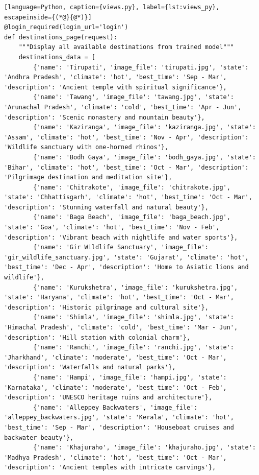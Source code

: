 \begin{lstlisting}[language=Python, caption={views.py}, label={lst:views_py}, escapeinside={(*@}{@*)}]
@login_required(login_url='login')
def destinations_page(request):
    """Display all available destinations from trained model"""
    destinations_data = [
        {'name': 'Tirupati', 'image_file': 'tirupati.jpg', 'state': 'Andhra Pradesh', 'climate': 'hot', 'best_time': 'Sep - Mar', 'description': 'Ancient temple with spiritual significance'},
        {'name': 'Tawang', 'image_file': 'tawang.jpg', 'state': 'Arunachal Pradesh', 'climate': 'cold', 'best_time': 'Apr - Jun', 'description': 'Scenic monastery and mountain beauty'},
        {'name': 'Kaziranga', 'image_file': 'kaziranga.jpg', 'state': 'Assam', 'climate': 'hot', 'best_time': 'Nov - Apr', 'description': 'Wildlife sanctuary with one-horned rhinos'},
        {'name': 'Bodh Gaya', 'image_file': 'bodh_gaya.jpg', 'state': 'Bihar', 'climate': 'hot', 'best_time': 'Oct - Mar', 'description': 'Pilgrimage destination and meditation site'},
        {'name': 'Chitrakote', 'image_file': 'chitrakote.jpg', 'state': 'Chhattisgarh', 'climate': 'hot', 'best_time': 'Oct - Mar', 'description': 'Stunning waterfall and natural beauty'},
        {'name': 'Baga Beach', 'image_file': 'baga_beach.jpg', 'state': 'Goa', 'climate': 'hot', 'best_time': 'Nov - Feb', 'description': 'Vibrant beach with nightlife and water sports'},
        {'name': 'Gir Wildlife Sanctuary', 'image_file': 'gir_wildlife_sanctuary.jpg', 'state': 'Gujarat', 'climate': 'hot', 'best_time': 'Dec - Apr', 'description': 'Home to Asiatic lions and wildlife'},
        {'name': 'Kurukshetra', 'image_file': 'kurukshetra.jpg', 'state': 'Haryana', 'climate': 'hot', 'best_time': 'Oct - Mar', 'description': 'Historic pilgrimage and cultural site'},
        {'name': 'Shimla', 'image_file': 'shimla.jpg', 'state': 'Himachal Pradesh', 'climate': 'cold', 'best_time': 'Mar - Jun', 'description': 'Hill station with colonial charm'},
        {'name': 'Ranchi', 'image_file': 'ranchi.jpg', 'state': 'Jharkhand', 'climate': 'moderate', 'best_time': 'Oct - Mar', 'description': 'Waterfalls and natural parks'},
        {'name': 'Hampi', 'image_file': 'hampi.jpg', 'state': 'Karnataka', 'climate': 'moderate', 'best_time': 'Oct - Feb', 'description': 'UNESCO heritage ruins and architecture'},
        {'name': 'Alleppey Backwaters', 'image_file': 'alleppey_backwaters.jpg', 'state': 'Kerala', 'climate': 'hot', 'best_time': 'Sep - Mar', 'description': 'Houseboat cruises and backwater beauty'},
        {'name': 'Khajuraho', 'image_file': 'khajuraho.jpg', 'state': 'Madhya Pradesh', 'climate': 'hot', 'best_time': 'Oct - Mar', 'description': 'Ancient temples with intricate carvings'},

\end{lstlisting}
